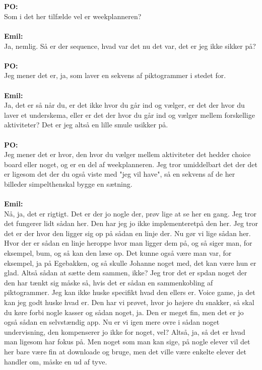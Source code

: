 \\\\
\textbf{PO:}\\
Som i det her tilfælde vel er weekplanneren?
\\\\
\textbf{Emil:}\\
Ja, nemlig.
Så er der sequence, hvad var det nu det var, det er jeg ikke sikker på?
\\\\
\textbf{PO:}\\
Jeg mener det er, ja, som laver en sekvens af piktogrammer i stedet for.
\\\\
\textbf{Emil:}\\
Ja, det er så når du, er det ikke hvor du går ind og vælger, er det der hvor du laver et underskema, eller er det der hvor du går ind og vælger mellem forskellige aktiviteter?
Det er jeg altså en lille smule usikker på.
\\\\
\textbf{PO:}\\
Jeg mener det er hvor, den hvor du vælger mellem aktiviteter det hedder choice board eller noget, og er en del af weekplanneren.
Jeg tror umiddelbart det der det er ligesom det der du også viste med "jeg vil have", så en sekvens af de her billeder simpelthenskal bygge en sætning.
\\\\
\textbf{Emil:}\\
Nå, ja, det er rigtigt. Det er der jo nogle der, prøv lige at se her en gang.
Jeg tror det fungerer lidt sådan her.
Den har jeg jo ikke implementeretpå den her.
Jeg tror det er der hvor den ligger sig op på sådan en linje der.
Nu gør vi lige sådan her.
Hvor der er sådan en linje heroppe hvor man ligger dem på, og så siger man, for eksempel, bum, og så kan den læse op.
Det kunne også være man var, for eksempel, ja på Egebakken, og så skulle Johanne noget med, det kan være hun er glad.
Altså sådan at sætte dem sammen, ikke?
Jeg tror det er spdan noget der den har tænkt sig måske så, hvis det er sådan en sammenkobling af piktogrammer.
Jeg kan ikke huske specifikt hvad den ellers er.
Voice game, ja det kan jeg godt huske hvad er.
Den har vi prøvet, hvor jo højere du snakker, så skal du køre forbi nogle kasser og sådan noget, ja.
Den er meget fin, men det er jo også sådan en selvstændig app.
Nu er vi igen mere ovre i sådan noget undervisning, den kompenserer jo ikke for noget, vel?
Altså, ja, så det er hvad man ligesom har fokus på. 
Men noget som man kan sige, på nogle elever vil det her bare være fin at downloade og bruge, men det ville være enkelte elever det handler om, måske en ud af tyve.
